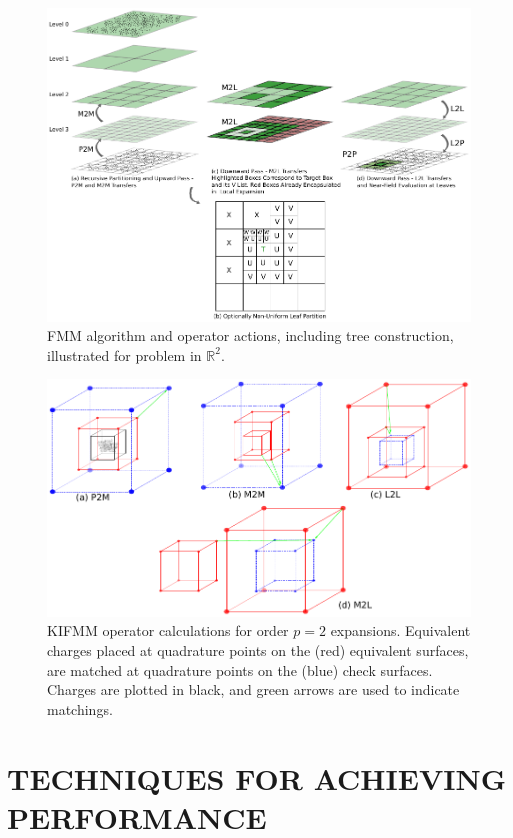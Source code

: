 \documentclass{IEEEcsmag}
\begin{document}
\begin{figure}
	\centerline{\includegraphics {figures/tree.pdf}}
	\caption{FMM algorithm and operator actions, including tree construction, illustrated for problem in $\mathbb{R}^2$.}
	\label{fig:algorithm}
\end{figure}

\begin{figure}
	\centerline{\includegraphics {figures/operators.pdf}}
	\caption{KIFMM operator calculations for order $p=2$ expansions. Equivalent charges placed at quadrature points on the (red) equivalent surfaces, are matched at quadrature points on the (blue) check surfaces. Charges are plotted in black, and green arrows are used to indicate matchings.}
	\label{fig:operators}
\end{figure}


\section{TECHNIQUES FOR ACHIEVING PERFORMANCE}
\end{document}
